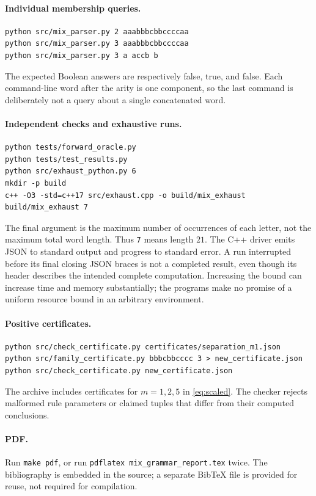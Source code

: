 \documentclass[11pt,letterpaper]{article}
\numberwithin{equation}{section}
\theoremstyle{definition}
\theoremstyle{remark}
\newcommand{\word}[1]{\texttt{#1}}
\begin{document}
\paragraph{Individual membership queries.}
\begin{lstlisting}
python src/mix_parser.py 2 aaabbbcbbccccaa
python src/mix_parser.py 3 aaabbbcbbccccaa
python src/mix_parser.py 3 a accb b
\end{lstlisting}
The expected Boolean answers are respectively false, true, and false.
Each command-line word after the arity is one component, so the last
command is deliberately not a query about a single concatenated word.

\paragraph{Independent checks and exhaustive runs.}
\begin{lstlisting}
python tests/forward_oracle.py
python tests/test_results.py
python src/exhaust_python.py 6
mkdir -p build
c++ -O3 -std=c++17 src/exhaust.cpp -o build/mix_exhaust
build/mix_exhaust 7
\end{lstlisting}
The final argument is the maximum number of occurrences of each letter,
not the maximum total word length. Thus \word{7} means length \(21\).
The C++ driver emits JSON to standard output and progress to standard
error. A run interrupted before its final closing JSON braces is not
a completed result, even though its header describes the intended
complete computation. Increasing the bound can increase time and
memory substantially; the programs make no promise of a uniform
resource bound in an arbitrary environment.

\paragraph{Positive certificates.}
\begin{lstlisting}
python src/check_certificate.py certificates/separation_m1.json
python src/family_certificate.py bbbcbbcccc 3 > new_certificate.json
python src/check_certificate.py new_certificate.json
\end{lstlisting}
The archive includes certificates for \(m=1,2,5\) in
\eqref{eq:scaled}. The checker rejects malformed rule parameters or
claimed tuples that differ from their computed conclusions.

\paragraph{PDF.}
Run \word{make pdf}, or run \word{pdflatex mix\_grammar\_report.tex}
twice. The bibliography is embedded in the source; a separate BibTeX
file is provided for reuse, not required for compilation.
\end{document}
